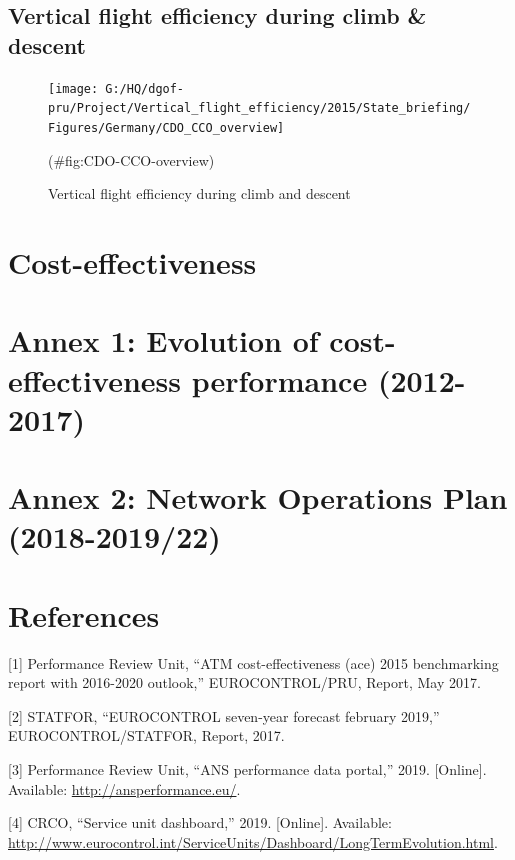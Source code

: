 \documentclass[
]{article}
\begin{document}
\hypertarget{vertical-flight-efficiency-during-climb-descent}{%
\subsection{Vertical flight efficiency during climb \& descent}\label{vertical-flight-efficiency-during-climb-descent}}

\begin{figure}

{\centering \texttt{[image: G:/HQ/dgof-pru/Project/Vertical\_flight\_efficiency/2015/State\_briefing/Figures/Germany/CDO\_CCO\_overview]} 

}

\caption{Vertical flight efficiency during climb and descent}(\#fig:CDO-CCO-overview)
\end{figure}

\newpage

\hypertarget{cost-effectiveness}{%
\section{Cost-effectiveness}\label{cost-effectiveness}}

\newpage

\hypertarget{annex-1-evolution-of-cost-effectiveness-performance-2012-2017}{%
\section{Annex 1: Evolution of cost-effectiveness performance (2012-2017)}\label{annex-1-evolution-of-cost-effectiveness-performance-2012-2017}}

\newpage

\hypertarget{annex-2-network-operations-plan-2018-201922}{%
\section{Annex 2: Network Operations Plan (2018-2019/22)}\label{annex-2-network-operations-plan-2018-201922}}

\newpage

\hypertarget{references}{%
\section*{References}\label{references}}

\hypertarget{refs}{}
\leavevmode\hypertarget{ref-pru:ace-report-2015}{}%
{[}1{]} Performance Review Unit, ``ATM cost-effectiveness (ace) 2015 benchmarking report with 2016-2020 outlook,'' EUROCONTROL/PRU, Report, May 2017.

\leavevmode\hypertarget{ref-7year-forecast-2019}{}%
{[}2{]} STATFOR, ``EUROCONTROL seven-year forecast february 2019,'' EUROCONTROL/STATFOR, Report, 2017.

\leavevmode\hypertarget{ref-ANS-perf-data-portal}{}%
{[}3{]} Performance Review Unit, ``ANS performance data portal,'' 2019. {[}Online{]}. Available: \url{http://ansperformance.eu/}.

\leavevmode\hypertarget{ref-service-unit-dashboard}{}%
{[}4{]} CRCO, ``Service unit dashboard,'' 2019. {[}Online{]}. Available: \url{http://www.eurocontrol.int/ServiceUnits/Dashboard/LongTermEvolution.html}.
\end{document}
